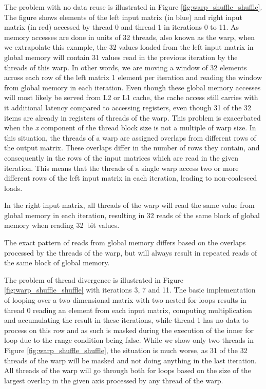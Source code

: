The problem with no data reuse is illustrated in Figure \ref{fig:warp_shuffle_shuffle}. The figure shows elements of the left input matrix (in blue) and right input matrix (in red) accessed by thread 0 and thread 1 in iterations 0 to 11. As memory accesses are done in units of 32 threads, also known as the warp, when we extrapolate this example, the 32 values loaded from the left input matrix in global memory will contain 31 values read in the previous iteration by the threads of this warp. In other words, we are moving a window of 32 elements across each row of the left matrix 1 element per iteration and reading the window from global memory in each iteration. Even though these global memory accesses will most likely be served from L2 or L1 cache, the cache access still carries  with it additional latency compared to accessing registers, even though 31 of the 32 items are already in registers of threads of the warp.
This problem is exacerbated when the \textit{x} component of the thread block size is not a multiple of warp size. In this situation, the threads of a warp are assigned overlaps from different rows of the output matrix. These overlaps differ in the number of rows they contain, and consequently in the rows of the input matrices which are read in the given iteration. This means that the threads of a single warp access two or more different rows of the left input matrix in each iteration, leading to non-coalesced loads.

In the right input matrix, all threads of the warp will read the same value from global memory in each iteration, resulting in 32 reads of the same block of global memory when reading 32~bit values. 

The exact pattern of reads from global memory differs based on the overlaps processed by the threads of the warp, but will always result in repeated reads of the same block of global memory.


The problem of thread divergence is illustrated in Figure \ref{fig:warp_shuffle_shuffle} with iterations 3, 7 and 11.
The basic implementation of looping over a two dimensional matrix with two nested for loops results in thread 0 reading an element from each input matrix, computing multiplication and accumulating the result in these iterations, while thread 1 has no data to process on this row and as such is masked during the execution of the inner for loop due to the range condition being false. While we show only two threads in Figure \ref{fig:warp_shuffle_shuffle}, the situation is much worse, as 31 of the 32 threads of the warp will be masked and not doing anything in the last iteration. All threads of the warp will go through both for loops based on the size of the largest overlap in the given axis processed by any thread of the warp. 

